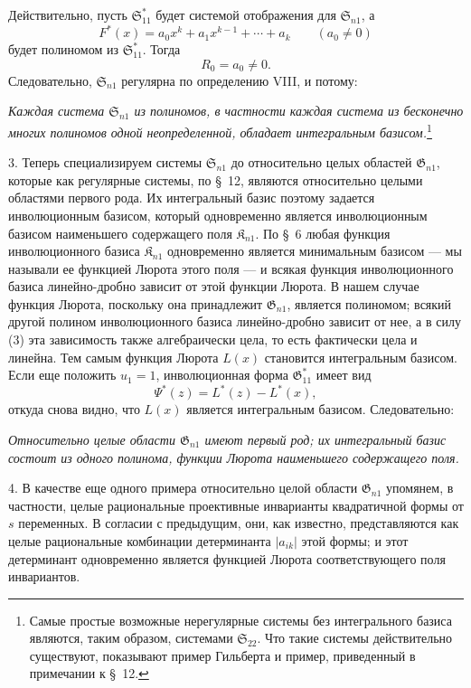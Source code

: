 \documentclass[11pt]{article}
\providecommand{\Kfield}{\mathfrak{K}}
\providecommand{\Ssys}{\mathfrak{S}}
\providecommand{\Gdom}{\mathfrak{G}}
\begin{document}
Действительно, пусть $\Ssys^*_{11}$ будет системой отображения для $\Ssys_{n1}$, а
\[
  F^*(x)=a_0x^k+a_1x^{k-1}+\cdots+a_k\qquad(a_0\ne0)
\]
будет полиномом из $\Ssys^*_{11}$. Тогда
\begin{equation}
  R_0=a_0\ne0.
\tag{3}
\end{equation}
Следовательно, $\Ssys_{n1}$ регулярна по определению VIII, и потому:

\emph{Каждая система $\Ssys_{n1}$ из полиномов, в частности каждая система из бесконечно многих полиномов одной неопределенной, обладает интегральным базисом.}\footnote{Самые простые возможные нерегулярные системы без интегрального базиса являются, таким образом, системами $\Ssys_{22}$. Что такие системы действительно существуют, показывают пример Гильберта и пример, приведенный в примечании к \S\ 12.}

3. Теперь специализируем системы $\Ssys_{n1}$ до относительно целых областей $\Gdom_{n1}$, которые как регулярные системы, по \S\ 12, являются относительно целыми областями первого рода. Их интегральный базис поэтому задается инволюционным базисом, который одновременно является инволюционным базисом наименьшего содержащего поля $\Kfield_{n1}$. По \S\ 6 любая функция инволюционного базиса $\Kfield_{n1}$ одновременно является минимальным базисом --- мы называли ее функцией Люрота этого поля --- и всякая функция инволюционного базиса линейно-дробно зависит от этой функции Люрота. В нашем случае функция Люрота, поскольку она принадлежит $\Gdom_{n1}$, является полиномом; всякий другой полином инволюционного базиса линейно-дробно зависит от нее, а в силу (3) эта зависимость также алгебраически цела, то есть фактически цела и линейна. Тем самым функция Люрота $L(x)$ становится интегральным базисом. Если еще положить $u_1=1$, инволюционная форма $\Gdom^*_{11}$ имеет вид
\[
  \Psi^*(z)=L^*(z)-L^*(x),
\]
откуда снова видно, что $L(x)$ является интегральным базисом. Следовательно:

\emph{Относительно целые области $\Gdom_{n1}$ имеют первый род; их интегральный базис состоит из одного полинома, функции Люрота наименьшего содержащего поля.}

4. В качестве еще одного примера относительно целой области $\Gdom_{n1}$ упомянем, в частности, целые рациональные проективные инварианты квадратичной формы от $s$ переменных. В согласии с предыдущим, они, как известно, представляются как целые рациональные комбинации детерминанта $|a_{ik}|$ этой формы; и этот детерминант одновременно является функцией Люрота соответствующего поля инвариантов.
\end{document}

